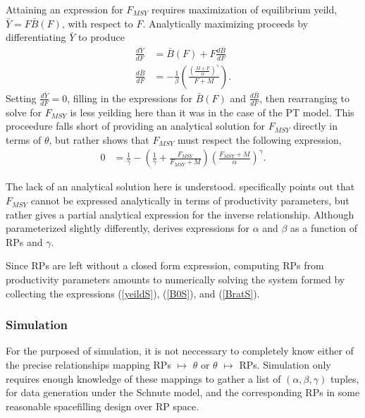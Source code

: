 \documentclass[12pt]{article}
\begin{document}
%
Attaining an expression for $F_{MSY}$ requires maximization of equilibrium 
yeild, $\bar{Y}=F\bar{B}(F)$, with respect to $F$. Analytically maximizing 
proceeds by differentiating $\bar{Y}$ to produce
%
\begin{align}
\frac{d \bar{Y}}{dF} &= \bar B(F) + F \frac{d \bar B}{dF} \label{FderivS}\\
\frac{d \bar B}{dF} &= -\frac{1}{\beta}  \left(\frac{\left(\frac{M+F}{\alpha}\right)^\gamma}{F+M}\right)\label{dBdFS}.
\end{align}
%
Setting $\frac{d \bar{Y}}{dF}=0$, filling in the expressions for $\bar B(F)$ 
and $\frac{d \bar B}{dF}$, then rearranging to solve for $F_{MSY}$ is less 
yeilding here than it was in the case of the PT model. This proceedure falls 
short of providing an analytical solution for $F_{MSY}$ directly in terms of 
$\theta$, %
but rather shows that $F_{MSY}$ must respect the following expression,  
%
\begin{align}
0 &= \frac{1}{\gamma} - \left(\frac{1}{\gamma} + \frac{F_{MSY}}{F_{MSY}+M}\right)\left(\frac{F_{MSY}+M}{\alpha}\right)^\gamma. \label{yeildS} 
\end{align}

The lack of an analytical solution here is understood. 
 specifically points out that 
$F_{MSY}$ cannot be expressed analytically in terms of productivity parameters, 
but rather gives a partial analytical expression for the inverse relationship. 
Although parameterized slightly differently,  
derives expressions for $\alpha$ and $\beta$ as a function of RPs and $\gamma$. 

%
Since RPs are left without a closed form expression, computing RPs from 
productivity parameters amounts to numerically solving the system formed by collecting the 
expressions (\ref{yeildS}), (\ref{B0S}), and (\ref{BratS}).

%
\subsubsection{Simulation}

%
For the purposed of simulation, it is not neccessary to completely know either 
of the precise relationships mapping RPs $\mapsto$ $\theta$ or $\theta$ $\mapsto$ 
RPs. Simulation only requires enough knowledge of these mappings to gather a list 
of $(\alpha, \beta, \gamma)$ tuples, for data generation under the Schnute model, 
and the corresponding RPs in some reasonable spacefilling design over RP space. 
\end{document}
